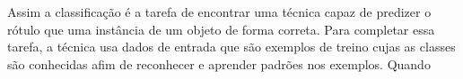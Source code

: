 
Assim a classificação é a tarefa de encontrar uma técnica capaz de predizer o rótulo que uma instância
de um objeto de forma correta.
Para completar essa tarefa, a técnica usa dados de entrada que são exemplos de treino cujas as classes são conhecidas afim de
reconhecer e aprender padrões nos exemplos. Quando 

